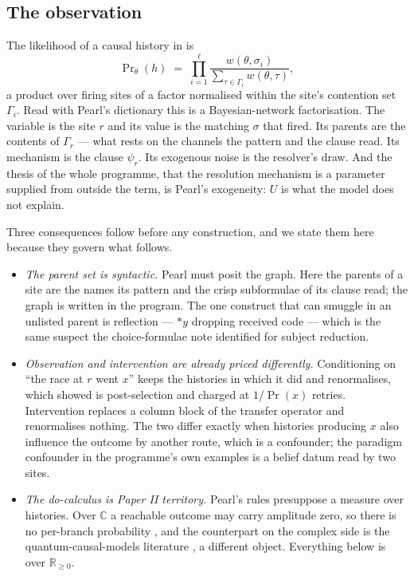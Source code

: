 \documentclass[11pt,a4paper]{article}
\theoremstyle{plain}
\theoremstyle{definition}
\theoremstyle{remark}
\newcommand{\Rnn}{\mathbb{R}_{\geq 0}}
\newcommand{\Cx}{\mathbb{C}}
\begin{document}
\subsection{The observation}

The likelihood of a causal history in \cite{GradedPLN} is
\begin{equation}\label{eq:lik}
  \Pr\nolimits_\theta(h) \;=\; \prod_{i=1}^{\ell}
  \frac{w(\theta,\sigma_i)}{\sum_{\tau \in \Gamma_i} w(\theta,\tau)} ,
\end{equation}
a product over firing sites of a factor normalised within the site's contention
set $\Gamma_i$. Read with Pearl's dictionary this is a Bayesian-network
factorisation. The variable is the site $r$ and its value is the matching
$\sigma$ that fired. Its parents are the contents of $\Gamma_r$ --- what rests
on the channels the pattern and the clause read. Its mechanism is the clause
$\psi_r$. Its exogenous noise is the resolver's draw. And the thesis of the
whole programme, that the resolution mechanism is a parameter supplied from
outside the term, is Pearl's exogeneity: $U$ is what the model does not
explain.

Three consequences follow before any construction, and we state them here
because they govern what follows.

\begin{itemize}[leftmargin=1.4em,itemsep=3pt]
\item \emph{The parent set is syntactic.} Pearl must posit the graph. Here the
parents of a site are the names its pattern and the crisp subformulae of its
clause read; the graph is written in the program. The one construct that can
smuggle in an unlisted parent is reflection --- $*y$ dropping received code ---
which is the same suspect the choice-formulae note \cite{ChoiceFormulae}
identified for subject reduction.
\item \emph{Observation and intervention are already priced differently.}
Conditioning on ``the race at $r$ went $x$'' keeps the histories in which it did
and renormalises, which \cite{GradedV4} showed is post-selection and charged at
$1/\Pr(x)$ retries. Intervention replaces a column block of the transfer
operator and renormalises nothing. The two differ exactly when histories
producing $x$ also influence the outcome by another route, which is a
confounder; the paradigm confounder in the programme's own examples is a belief
datum read by two sites.
\item \emph{The do-calculus is Paper II territory.} Pearl's rules presuppose a
measure over histories. Over $\Cx$ a reachable outcome may carry amplitude zero,
so there is no per-branch probability \cite[Principle~3.5]{GradedPLN}, and the
counterpart on the complex side is the quantum-causal-models literature
\cite{CostaShrapnel,AllenEtAl}, a different object. Everything below is over
$\Rnn$.
\end{itemize}
\end{document}
